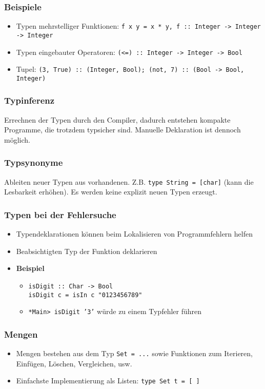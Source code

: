 \subsubsection{Beispiele}
\begin{itemize}
	\item Typen mehrstelliger Funktionen: \texttt{f x y = x * y, f :: Integer -> Integer -> Integer}
	\item Typen eingebauter Operatoren: \texttt{(<=) :: Integer -> Integer -> Bool}
	\item Tupel: \texttt{(3, True) :: (Integer, Bool); (not, 7) :: (Bool -> Bool, Integer)}
\end{itemize}

\subsubsection{Typinferenz}
Errechnen der Typen durch den Compiler, dadurch entstehen kompakte Programme, die trotzdem typsicher sind. Manuelle Deklaration ist dennoch möglich.

\subsubsection{Typsynonyme}
Ableiten neuer Typen aus vorhandenen. Z.B. \texttt{type String = {[}char{]}} (kann die Lesbarkeit erhöhen). Es werden keine explizit neuen Typen erzeugt.

\subsubsection{Typen bei der Fehlersuche}
\begin{itemize}
	\item Typendeklarationen können beim Lokalisieren von Programmfehlern helfen
	\item Beabsichtigten Typ der Funktion deklarieren
	\item \textbf{Beispiel}
	\begin{itemize}
		\item \texttt{isDigit :: Char -> Bool}\\\texttt{isDigit c = isIn c "0123456789"}
		\item \texttt{*Main> isDigit '3'} würde zu einem Typfehler führen
	\end{itemize}
\end{itemize}

\subsubsection{Mengen}
\begin{itemize}
	\item Mengen bestehen aus dem Typ \texttt{Set = ...} sowie Funktionen zum Iterieren, Einfügen, Löschen, Vergleichen, usw.
	\item Einfachste Implementierung als Listen: \texttt{type Set t = {[} {]}}
\end{itemize}


